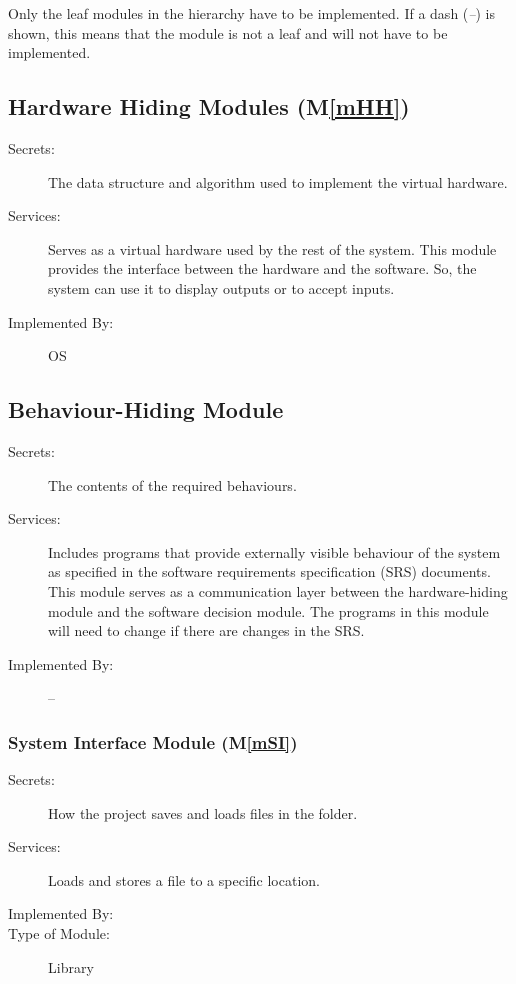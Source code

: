 \documentclass[12pt, titlepage]{article}
\newcommand{\mref}[1]{M\ref{#1}}
\begin{document}
Only the leaf modules in the hierarchy have to be implemented. If a dash
(\emph{--}) is shown, this means that the module is not a leaf and will not have
to be implemented.

\subsection{Hardware Hiding Modules (\mref{mHH})}

\begin{description}
\item[Secrets:]The data structure and algorithm used to implement the virtual
  hardware.
\item[Services:]Serves as a virtual hardware used by the rest of the
  system. This module provides the interface between the hardware and the
  software. So, the system can use it to display outputs or to accept inputs.
\item[Implemented By:] OS
\end{description}

\subsection{Behaviour-Hiding Module}

\begin{description}
\item[Secrets:]The contents of the required behaviours.
\item[Services:]Includes programs that provide externally visible behaviour of
  the system as specified in the software requirements specification (SRS)
  documents. This module serves as a communication layer between the
  hardware-hiding module and the software decision module. The programs in this
  module will need to change if there are changes in the SRS.
\item[Implemented By:] --
\end{description}

\subsubsection{System Interface Module (\mref{mSI})}

\begin{description}
\item[Secrets:]How the project saves and loads files in the folder.
\item[Services:]Loads and stores a file to a specific location.
\item[Implemented By:] \progname
\item[Type of Module:] Library
\end{description}
\end{document}
